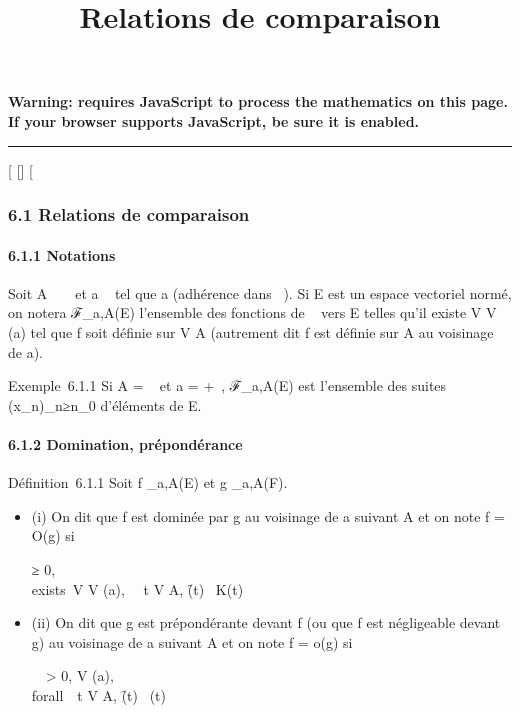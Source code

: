 \documentclass[]{article}
\title{Relations de comparaison}
\author{}
\date{}
\begin{document}
\maketitle

\textbf{Warning: 
requires JavaScript to process the mathematics on this page.\\ If your
browser supports JavaScript, be sure it is enabled.}

\begin{center}\rule{3in}{0.4pt}\end{center}

[
[]
[

\subsubsection{6.1 Relations de comparaison}

\paragraph{6.1.1 Notations}

Soit A \subset~ ~ et a \in\overline{}~ tel que a
\in\overlineA (adhérence dans
\overline{}~). Si E est un espace vectoriel normé, on
notera ℱ_a,A(E) l'ensemble des fonctions de ~ vers E telles
qu'il existe V \in V (a) tel que f soit définie sur V \bigcap A (autrement dit f
est définie sur A au voisinage de a).

Exemple~6.1.1 Si A = ~ et a = +\infty~, ℱ_a,A(E) est l'ensemble des
suites (x_n)_n≥n_0 d'éléments de E.

\paragraph{6.1.2 Domination, prépondérance}

Définition~6.1.1 Soit f _a,A(E) et g _a,A(F).

\begin{itemize}
\item
  (i) On dit que f est dominée par g au voisinage de a suivant A et on
  note f = O(g) si

  \existsK ≥ 0, \\exists~V \in V
  (a), \forall~~t \in V \bigcap A,
  \f(t)\ \leq
  K\g(t)\
\item
  (ii) On dit que g est prépondérante devant f (ou que f est négligeable
  devant g) au voisinage de a suivant A et on note f = o(g) si

  \forall~~\epsilon > 0,
  \existsV \in V (a), \\forall~~t \in V
  \bigcap A, \f(t)\ \leq
  \epsilon\g(t)\
\end{itemize}
\end{document}
